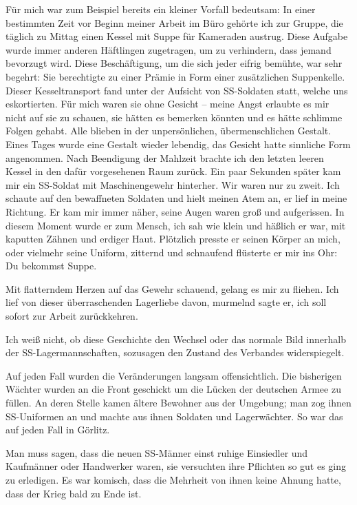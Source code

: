 Für mich war zum Beispiel bereits ein kleiner Vorfall bedeutsam: In einer bestimmten Zeit vor Beginn meiner Arbeit im Büro gehörte ich zur Gruppe, die täglich zu Mittag einen Kessel mit Suppe für Kameraden austrug. Diese Aufgabe wurde immer anderen Häftlingen zugetragen, um zu verhindern, dass jemand bevorzugt wird. Diese Beschäftigung, um die sich jeder eifrig bemühte, war sehr begehrt: Sie berechtigte zu einer Prämie in Form einer zusätzlichen Suppenkelle. Dieser Kesseltransport fand unter der Aufsicht von SS-Soldaten statt, welche uns eskortierten. Für mich waren sie ohne Gesicht -- meine Angst erlaubte es mir nicht auf sie zu schauen, sie hätten es bemerken könnten und es hätte schlimme Folgen gehabt. Alle blieben in der unpersönlichen, übermenschlichen Gestalt.
Eines Tages wurde eine Gestalt  wieder lebendig, das Gesicht hatte sinnliche Form angenommen. Nach Beendigung der Mahlzeit brachte ich den letzten leeren Kessel in den dafür vorgesehenen Raum zurück. Ein paar Sekunden später kam mir ein SS-Soldat mit Maschinengewehr hinterher. Wir waren nur zu zweit. Ich schaute auf den bewaffneten Soldaten und hielt meinen Atem an, er lief in meine Richtung. Er kam mir immer näher, seine Augen waren groß und aufgerissen. In diesem Moment wurde er zum Mensch, ich sah wie klein und häßlich er war, mit kaputten Zähnen und erdiger Haut. Plötzlich presste er seinen Körper an mich, oder vielmehr seine Uniform, zitternd und schnaufend flüsterte er mir ins Ohr: \glqq Du bekommst Suppe\grqq.

Mit flatterndem Herzen auf das Gewehr schauend, gelang es mir zu fliehen. 
Ich lief von dieser überraschenden Lagerliebe davon, murmelnd sagte er, ich soll sofort zur Arbeit zurückkehren.

Ich weiß nicht, ob diese Geschichte den Wechsel oder das normale Bild innerhalb der SS-La\-ger\-mann\-schaften, sozusagen den Zustand des Verbandes widerspiegelt.

Auf jeden Fall wurden die Veränderungen langsam offensichtlich. Die bisherigen Wächter wurden an die Front geschickt um die Lücken der deutschen Armee zu füllen. An deren Stelle kamen ältere Bewohner aus der Umgebung; man zog ihnen SS-Uniformen an und machte aus ihnen Soldaten und Lagerwächter. So war das auf jeden Fall in Görlitz.

Man muss sagen, dass die neuen SS-Männer einst ruhige Einsiedler und Kaufmänner oder Handwerker waren, sie versuchten ihre Pflichten so gut es ging zu erledigen. Es war komisch, dass die Mehrheit von ihnen keine Ahnung hatte, dass der Krieg bald zu Ende ist.

